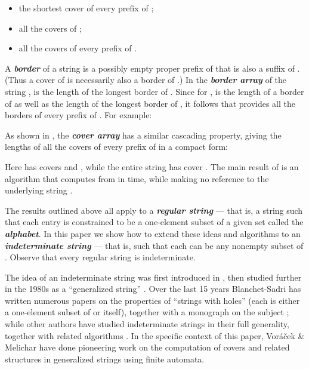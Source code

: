 \documentclass[runningheads,a4paper]{llncs}
\def\s#1{\mbox{\boldmath }}
\def\itbf#1{\textit{\textbf{#1}}}
\begin{document}
\begin{itemize}
\item[]
the shortest cover of every prefix of \s{x} \cite{B92};
\item[]
all the covers of \s{x} \cite{MS94,MS95};
\item[]
all the covers of every prefix of \s{x} \cite{LS02}.
\end{itemize}

A \itbf{border} of a string \s{x} is a possibly empty
proper prefix of \s{x} that is also a suffix of \s{x}.
(Thus a cover of \s{x} is necessarily also a border of \s{x}.)
In the \itbf{border array} 
of the string ,
 is the length of the longest border of .
Since for , 
is the length of a border of \s{x} as well as
the length of the longest border of 
\cite{AHU74,S03},
it follows that  provides all the borders
of every prefix of \s{x}.
For example:



As shown in \cite{LS02}, the \itbf{cover array} \s{\gamma}
has a similar cascading property, giving the lengths
of all the covers of every prefix of \s{x} in a compact form:

 

Here  has covers 
and ,
while the entire string \s{x} has cover \s{u_2}.
The main result of \cite{LS02} is an algorithm that computes
 from 
in  time, while making no reference
to the underlying string \s{x}.

The results outlined above all apply to a \itbf{regular string} --- that
is, a string \s{x} such that each entry  is constrained to be a one-element
subset of a given set  called the \itbf{alphabet}.
In this paper we show how to extend these ideas and algorithms
to an \itbf{indeterminate string} \s{x} --- that is,
such that each  can be any nonempty subset of .
Observe that every regular string is indeterminate.

The idea of an indeterminate string was first introduced in
\cite{FP74}, then studied further in the 1980s as a ``generalized string''
\cite{A87}.
Over the last 15 years Blanchet-Sadri has written
numerous papers on the properties of ``strings with holes''
(each  is either a one-element subset of 
or  itself),
together with a monograph on the subject \cite{BS07};
while other authors have studied indeterminate strings
in their full generality, together with related algorithms
\cite{BRS09,NRR12,HS03,HSW08,SW08,SW09a,SW09,CRSW13}.
In the specific context of this paper, Vor\'{a}\v{c}ek \& Melichar \cite{VM05}
have done pioneering work on the computation of covers and related structures
in generalized strings using finite automata.
\end{document}
